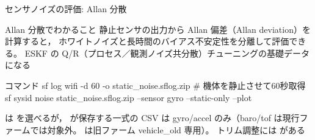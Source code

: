 \begin{frame}[fragile]{センサノイズの評価: Allan 分散\later}
  \begin{block}{Allan 分散でわかること}\small
    静止センサの出力から Allan 偏差（Allan deviation）を計算すると，
    ホワイトノイズと長時間のバイアス不安定性を分離して評価できる。
    ESKF の Q/R（プロセス／観測ノイズ共分散）チューニングの基礎データになる
  \end{block}

  \vspace{0.2em}

  \begin{sflisting}[basicstyle=\ttfamily\scriptsize]{コマンド}
sf log wifi -d 60 -o static_noise.sflog.zip   # 機体を静止させて60秒取得
sf sysid noise static_noise.sflog.zip --sensor gyro --static-only --plot
  \end{sflisting}

  \vspace{-1.5mm}

  {\footnotesize {} は  を選べるが，
   が保存する一式の CSV は gyro/accel のみ（baro/tof は現行ファームでは対象外。
   は旧ファーム vehicle\_old 専用）。
  トリム調整には  がある}
\end{frame}

